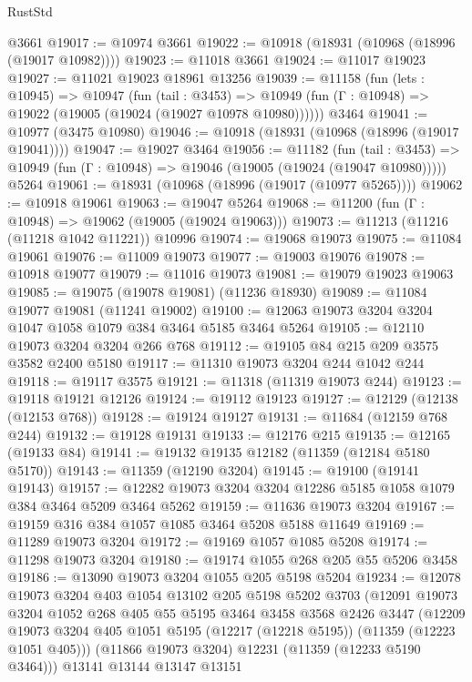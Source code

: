 \begin{lexlean}{RustStd}
\begin{coremodule}
{{{{{{{{{{{{{{{{{{{    @3661
@19017 := @10974 @3661
@19022 := @10918 (@18931 (@10968 (@18996 (@19017 @10982))))
@19023 := @11018 @3661
@19024 := @11017 @19023
@19027 := @11021 @19023 @18961 @13256
@19039 := @11158
    (fun (lets : @10945) =>
    @10947
      (fun (tail : @3453) =>
      @10949 (fun (Γ : @10948) => @19022 (@19005 (@19024 (@19027 @10978 @10980))))))
    @3464
@19041 := @10977 (@3475 @10980)
@19046 := @10918 (@18931 (@10968 (@18996 (@19017 @19041))))
@19047 := @19027 @3464
@19056 := @11182
    (fun (tail : @3453) => @10949 (fun (Γ : @10948) => @19046 (@19005 (@19024 (@19047 @10980)))))
    @5264
@19061 := @18931 (@10968 (@18996 (@19017 (@10977 @5265))))
@19062 := @10918 @19061
@19063 := @19047 @5264
@19068 := @11200 (fun (Γ : @10948) => @19062 (@19005 (@19024 @19063)))
@19073 := @11213 (@11216 (@11218 @1042 @11221)) @10996
@19074 := @19068 @19073
@19075 := @11084 @19061
@19076 := @11009 @19073
@19077 := @19003 @19076
@19078 := @10918 @19077
@19079 := @11016 @19073
@19081 := @19079 @19023 @19063
@19085 := @19075 (@19078 @19081) (@11236 @18930)
@19089 := @11084 @19077 @19081 (@11241 @19002)
@19100 := @12063 @19073 @3204 @3204 @1047 @1058 @1079 @384 @3464 @5185 @3464 @5264
@19105 := @12110 @19073 @3204 @3204 @266 @768
@19112 := @19105 @84 @215 @209 @3575 @3582 @2400 @5180
@19117 := @11310 @19073 @3204 @244 @1042 @244
@19118 := @19117 @3575
@19121 := @11318 (@11319 @19073 @244)
@19123 := @19118 @19121 @12126
@19124 := @19112 @19123
@19127 := @12129 (@12138 (@12153 @768))
@19128 := @19124 @19127
@19131 := @11684 (@12159 @768 @244)
@19132 := @19128 @19131
@19133 := @12176 @215
@19135 := @12165 (@19133 @84)
@19141 := @19132 @19135 @12182 (@11359 (@12184 @5180 @5170))
@19143 := @11359 (@12190 @3204)
@19145 := @19100 (@19141 @19143)
@19157 := @12282 @19073 @3204 @3204 @12286 @5185 @1058 @1079 @384 @3464 @5209 @3464 @5262
@19159 := @11636 @19073 @3204
@19167 := @19159 @316 @384 @1057 @1085 @3464 @5208 @5188 @11649
@19169 := @11289 @19073 @3204
@19172 := @19169 @1057 @1085 @5208
@19174 := @11298 @19073 @3204
@19180 := @19174 @1055 @268 @205 @55 @5206 @3458
@19186 := @13090 @19073 @3204 @1055 @205 @5198 @5204
@19234 := @12078
    @19073
    @3204
    @403
    @1054
    @13102
    @205
    @5198
    @5202
    @3703
    (@12091
      @19073
      @3204
      @1052
      @268
      @405
      @55
      @5195
      @3464
      @3458
      @3568
      @2426
      @3447
      (@12209 @19073 @3204 @405 @1051 @5195 (@12217 (@12218 @5195)) (@11359 (@12223 @1051 @405)))
      (@11866 @19073 @3204)
      @12231
      (@11359 (@12233 @5190 @3464)))
    @13141
    @13144
    @13147
    @13151
}}}}}}}}}}}}}}}}}}}
\end{coremodule}
\end{lexlean}

